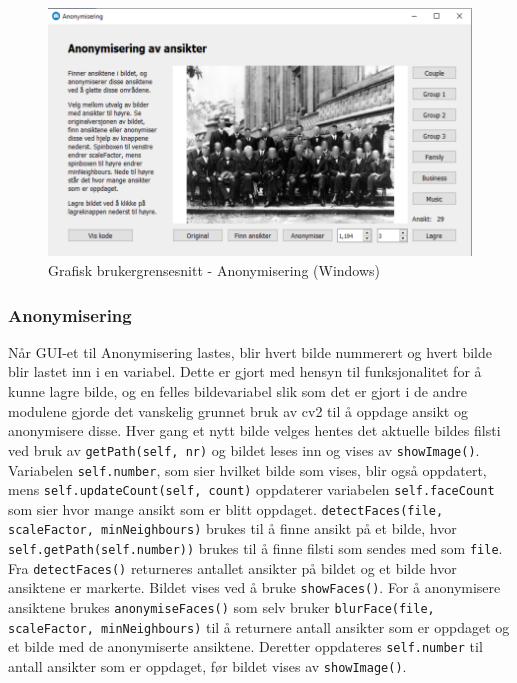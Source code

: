 \begin{figure}[H]
\begin{center}
    \includegraphics[width=0.9\columnwidth]{bilder/Gui/guiExampleAnon.png}
     \caption{Grafisk brukergrensesnitt - Anonymisering (Windows) \label{fig:guiexample2}}
\end{center}
\end{figure}

\subsubsection{Anonymisering}
Når GUI-et til Anonymisering lastes, blir hvert bilde nummerert og hvert bilde blir lastet inn i en variabel. Dette er gjort med hensyn til funksjonalitet for å kunne lagre bilde, og en felles bildevariabel slik som det er gjort i de andre modulene gjorde det vanskelig grunnet bruk av cv2 til å oppdage ansikt og anonymisere disse. Hver gang et nytt bilde velges hentes det aktuelle bildes filsti ved bruk av \texttt{getPath(self, nr)} og bildet leses inn og vises av \texttt{showImage()}. Variabelen \texttt{self.number}, som sier hvilket bilde som vises, blir også oppdatert, mens \texttt{self.updateCount(self, count)} oppdaterer variabelen \texttt{self.faceCount} som sier hvor mange ansikt som er blitt oppdaget. \texttt{detectFaces(file, scaleFactor, minNeighbours)} brukes til å finne ansikt på et bilde, hvor \texttt{self.getPath(self.number))} brukes til å finne filsti som sendes med som \texttt{file}. Fra \texttt{detectFaces()} returneres antallet ansikter på bildet og et bilde hvor ansiktene er markerte. Bildet vises ved å bruke \texttt{showFaces()}. For å anonymisere ansiktene brukes \texttt{anonymiseFaces()} som selv bruker \texttt{blurFace(file, scaleFactor, minNeighbours)} til å returnere antall ansikter som er oppdaget og et bilde med de anonymiserte ansiktene. Deretter oppdateres \texttt{self.number} til antall ansikter som er oppdaget, før bildet vises av \texttt{showImage()}.

